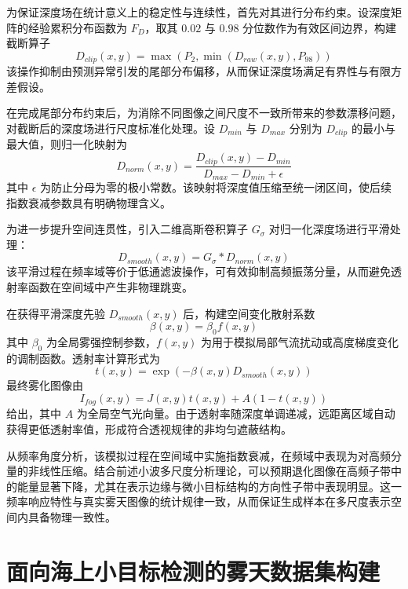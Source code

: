 为保证深度场在统计意义上的稳定性与连续性，首先对其进行分布约束。设深度矩阵的经验累积分布函数为 $F_D$，取其 $0.02$ 与 $0.98$ 分位数作为有效区间边界，构建截断算子
\begin{equation}
D_{clip}(x,y)=\max\left(P_{2},\min\left(D_{raw}(x,y),P_{98}\right)\right)
\end{equation}
该操作抑制由预测异常引发的尾部分布偏移，从而保证深度场满足有界性与有限方差假设。

在完成尾部分布约束后，为消除不同图像之间尺度不一致所带来的参数漂移问题，对截断后的深度场进行尺度标准化处理。设 $D_{min}$ 与 $D_{max}$ 分别为 $D_{clip}$ 的最小与最大值，则归一化映射为
\begin{equation}
D_{norm}(x,y)=\frac{D_{clip}(x,y)-D_{min}}{D_{max}-D_{min}+\epsilon}
\end{equation}
其中 $\epsilon$ 为防止分母为零的极小常数。该映射将深度值压缩至统一闭区间，使后续指数衰减参数具有明确物理含义。

为进一步提升空间连贯性，引入二维高斯卷积算子 $G_{\sigma}$ 对归一化深度场进行平滑处理：
\begin{equation}
D_{smooth}(x,y)=G_{\sigma} * D_{norm}(x,y)
\end{equation}
该平滑过程在频率域等价于低通滤波操作，可有效抑制高频振荡分量，从而避免透射率函数在空间域中产生非物理跳变。

在获得平滑深度先验 $D_{smooth}(x,y)$ 后，构建空间变化散射系数
\begin{equation}
\beta(x,y)=\beta_0 f(x,y)
\end{equation}
其中 $\beta_0$ 为全局雾强控制参数，$f(x,y)$ 为用于模拟局部气流扰动或高度梯度变化的调制函数。透射率计算形式为
\begin{equation}
t(x,y)=\exp\left(-\beta(x,y)D_{smooth}(x,y)\right)
\end{equation}
最终雾化图像由
\begin{equation}
I_{fog}(x,y)=J(x,y)t(x,y)+A\left(1-t(x,y)\right)
\end{equation}
给出，其中 $A$ 为全局空气光向量。由于透射率随深度单调递减，远距离区域自动获得更低透射率值，形成符合透视规律的非均匀遮蔽结构。

从频率角度分析，该模拟过程在空间域中实施指数衰减，在频域中表现为对高频分量的非线性压缩。结合前述小波多尺度分析理论，可以预期退化图像在高频子带中的能量显著下降，尤其在表示边缘与微小目标结构的方向性子带中表现明显。这一频率响应特性与真实雾天图像的统计规律一致，从而保证生成样本在多尺度表示空间内具备物理一致性。

\section{面向海上小目标检测的雾天数据集构建}


